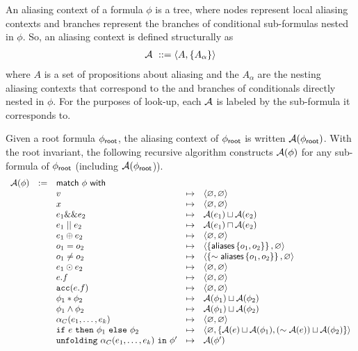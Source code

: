 \newcommand{\context}[2]{\langle #1, #2 \rangle}

An aliasing context of a formula $\phi$ is a tree, where nodes represent local aliasing contexts and branches represent the branches of conditional sub-formulas nested in $\phi$. So, an aliasing context is defined structurally as
\begin{align*}
  \A \ ::= \context{A}{\set{A_\alpha}}
\end{align*}
where $A$ is a set of propositions about aliasing and the $A_\alpha$ are the nesting aliasing contexts that correspond to the  and  branches of conditionals directly nested in $\phi$. For the purposes of look-up, each $\mathcal{A}$ is labeled by the sub-formula it corresponds to.

Given a root formula $\phi_\textsf{root}$, the aliasing context of $\phi_\textsf{root}$ is written $\mathcal{A}(\phi_\textsf{root})$. With the root invariant, the following recursive algorithm constructs $\mathcal{A}(\phi)$ for any sub-formula of $\phi_\textsf{root}$ (including $\mathcal{A}(\phi_\textsf{root}$)).
%
\begin{align*}
\begin{array}{rclcl}
\A(\phi) &:=& \tsf{match} \ \phi \ \tsf{with} \\
&& v &\mt&
  \context{\empty}{\empty}
\\
&& x &\mt&
  \context{\empty}{\empty}
\\
&& e_1 \band e_2 &\mt&
  \A(e_1) \contextunion \A(e_2)
\\
&& e_1 \bor e_2 &\mt&
  \A(e_1) \contextintersection \A(e_2)
\\
&& e_1 \oplus e_2 &\mt&
  \context{\empty}{\empty}
\\
&& o_1 = o_2 &\mt&
  \context{\set{\aliases\set{o_1, o_2}}}{\empty} %
\\
&& o_1 \neq o_2 &\mt&
  \context{\set{\pnot \aliases\set{o_1, o_2}}}{\empty}
\\
&& e_1 \odot e_2 &\mt&
  \context{\empty}{\empty}
\\
&& e.f &\mt&
  \context{\empty}{\empty}
\\
&& \cacc(e.f) &\mt&
  \context{\empty}{\empty}
\\
&& \phi_1 \ast \phi_2 &\mt&
  \A(\phi_1) \contextunion \A(\phi_2)
\\
&& \phi_1 \land \phi_2 &\mt&
  \A(\phi_1) \contextunion \A(\phi_2)
\\
&& \alpha_C(e_1, \dots, e_k) &\mt&
  \context{\empty}{\empty}
\\
&& \cif \ e \ \cthen \ \phi_1 \ \celse \ \phi_2 &\mt&
  \context{\empty}{\set{ \A(e) \contextunion \A(\phi_1), (\pnot \A(e)) \contextunion \A(\phi_2) }}
\\
&& \cunfolding \ \alpha_C(e_1, \dots, e_k) \ \cin \ \phi\p &\mt&
  \A(\phi\p)
\end{array}
\end{align*}

